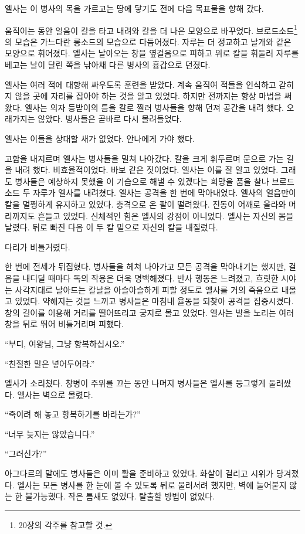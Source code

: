 엘사는 이 병사의 목을 가르고는 땅에 닿기도 전에 다음 목표물을 향해 갔다.

움직이는 동안 얼음이 칼을 타고 내려와 칼을 더 나은 모양으로 바꾸었다. 브로드소드\footnote{20장의 각주를 참고할 것.}의 모습은 가느다란 롱소드의 모습으로 다듬어졌다. 자루는 더 정교하고 날개와 같은 모양으로 휘어졌다. 엘사는 날아오는 창을 옆걸음으로 피하고 위로 칼을 휘둘러 자루를 베고는 날이 달린 쪽을 낚아채 다른 병사의 흉갑으로 던졌다.

엘사는 여러 적에 대항해 싸우도록 훈련을 받았다. 계속 움직여 적들을 인식하고 갇히지 않을 곳에 자리를 잡아야 하는 것을 알고 있었다. 하지만 전까지는 항상 마법을 써 왔다. 엘사는 의자 등받이의 틈을 칼로 찔러 병사들을 향해 던져 공간을 내려 했다. 오래가지는 않았다. 병사들은 곧바로 다시 몰려들었다.

엘사는 이들을 상대할 새가 없었다. 안나에게 가야 했다.

고함을 내지르며 엘사는 병사들을 밀쳐 나아갔다. 칼을 크게 휘두르며 문으로 가는 길을 내려 했다. 비효율적이었다. 바보 같은 짓이었다. 엘사는 이를 잘 알고 있었다. 그래도 병사들은 예상하지 못했을 이 기습으로 해낼 수 있겠다는 희망을 품을 찰나 브로드소드 두 자루가 엘사를 내려쳤다. 엘사는 공격을 한 번에 막아내었다. 엘사의 얼음만이 칼을 멀쩡하게 유지하고 있었다. 충격으로 온 팔이 떨려왔다. 진동이 어깨로 올라와 머리까지도 흔들고 있었다. 신체적인 힘은 엘사의 강점이 아니었다. 엘사는 자신의 몸을 날렸다. 뒤로 빠진 다음 이 두 칼 밑으로 자신의 칼을 내질렀다.

다리가 비틀거렸다.

한 번에 전세가 뒤집혔다. 병사들을 헤쳐 나아가고 모든 공격을 막아내기는 했지만, 걸음을 내디딜 때마다 독의 작용은 더욱 명백해졌다. 반사 행동은 느려졌고, 흐릿한 시야는 사각지대로 날아드는 칼날을 아슬아슬하게 피할 정도로 엘사를 거의 죽음으로 내몰고 있었다. 약해지는 것을 느끼고 병사들은 마침내 율동을 되찾아 공격을 집중시켰다. 창의 길이를 이용해 거리를 떨어뜨리고 궁지로 몰고 있었다. 엘사는 발을 노리는 여러 창을 뒤로 뛰어 비틀거리며 피했다.

``부디, 여왕님, 그냥 항복하십시오.''

``친절한 말은 넣어두어라.''

엘사가 소리쳤다. 창병이 주위를 끄는 동안 나머지 병사들은 엘사를 둥그렇게 둘러쌌다. 엘사는 벽으로 몰렸다.

``죽이려 해 놓고 항복하기를 바라는가?''

``너무 늦지는 않았습니다.''

``그러신가?''

아그다르의 말에도 병사들은 이미 활을 준비하고 있었다. 화살이 걸리고 시위가 당겨졌다. 엘사는 모든 병사를 한 눈에 볼 수 있도록 뒤로 물러서려 했지만, 벽에 눌어붙지 않는 한 불가능했다. 작은 틈새도 없었다. 탈출할 방법이 없었다.

